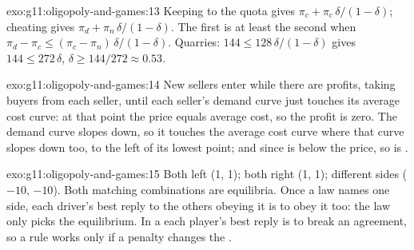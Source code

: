 \begin{solution}{exo:g11:oligopoly-and-games:13}
Keeping to the quota gives $\pi_c + \pi_c\,\delta/(1 - \delta)$; cheating gives $\pi_d + \pi_n\,\delta/(1 - \delta)$. The first is at least the second when $\pi_d - \pi_c \leq (\pi_c -
\pi_n)\,\delta/(1 - \delta)$. Quarries: $144 \leq 128\,\delta/(1 - \delta)$ gives $144 \leq 272\,\delta$, $\delta \geq 144/272 \approx 0.53$.
\end{solution}

\begin{solution}{exo:g11:oligopoly-and-games:14}
New sellers enter while there are profits, taking buyers from each seller, until each seller's demand curve just touches its average cost curve: at that point the price
equals average cost, so the profit is zero. The demand curve slopes down, so it touches the average cost curve where that curve slopes down too, to the left of its lowest
point; and since  is below the price, so is .
\end{solution}

\begin{solution}{exo:g11:oligopoly-and-games:15}
Both left (1, 1); both right (1, 1); different sides ($-10$, $-10$). Both matching combinations are equilibria. Once a law names one side, each driver's best reply to the
others obeying it is to obey it too: the law only picks the equilibrium. In a  each player's best reply is to break an agreement, so a rule works only if a
penalty changes the .
\end{solution}

